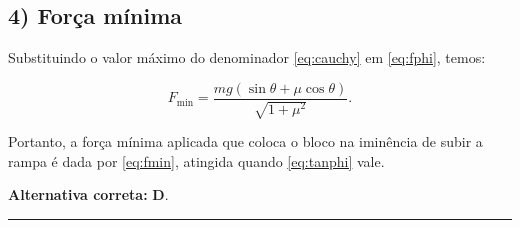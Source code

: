 \documentclass[a4paper,12pt]{article}
\begin{document}
\begin{flushleft}
\subsection*{4) Força mínima}

Substituindo o valor máximo do denominador \eqref{eq:cauchy} em \eqref{eq:fphi}, temos:

\begin{equation}\label{eq:fmin}
F_{\min} = \frac{mg(\sin\theta + \mu\cos\theta)}{\sqrt{1+\mu^2}}.
\end{equation}

Portanto, a força mínima aplicada que coloca o bloco na iminência de subir a rampa é dada por \eqref{eq:fmin}, atingida quando \eqref{eq:tanphi} vale.


\textbf{Alternativa correta:} \textbf{D}.
\end{flushleft}

\newpage

\noindent\rule{\linewidth}{0.6pt}\\
\end{document}
